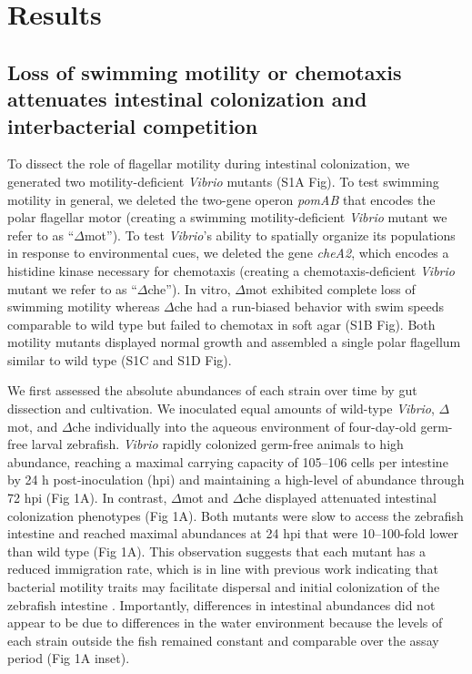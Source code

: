\section{Results}

\subsection{Loss of swimming motility or chemotaxis attenuates intestinal colonization and interbacterial competition}
To dissect the role of flagellar motility during intestinal colonization, we generated two motility-deficient \textit{Vibrio} mutants (S1A Fig). To test swimming motility in general, we deleted the two-gene operon \textit{pomAB} that encodes the polar flagellar motor (creating a swimming motility-deficient \textit{Vibrio} mutant we refer to as ``$\Delta$mot''). To test \textit{Vibrio}'s ability to spatially organize its populations in response to environmental cues, we deleted the gene \textit{cheA2}, which encodes a histidine kinase necessary for chemotaxis (creating a chemotaxis-deficient \textit{Vibrio} mutant we refer to as ``$\Delta$che''). In vitro, $\Delta$mot exhibited complete loss of swimming motility whereas $\Delta$che had a run-biased behavior with swim speeds comparable to wild type but failed to chemotax in soft agar (S1B Fig). Both motility mutants displayed normal growth and assembled a single polar flagellum similar to wild type (S1C and S1D Fig). 

We first assessed the absolute abundances of each strain over time by gut dissection and cultivation. We inoculated equal amounts of wild-type \textit{Vibrio}, $\Delta$mot, and $\Delta$che individually into the aqueous environment of four-day-old germ-free larval zebrafish. \textit{Vibrio} rapidly colonized germ-free animals to high abundance, reaching a maximal carrying capacity of 105–106 cells per intestine by 24 h post-inoculation (hpi) and maintaining a high-level of abundance through 72 hpi (Fig 1A). In contrast, $\Delta$mot and $\Delta$che displayed attenuated intestinal colonization phenotypes (Fig 1A). Both mutants were slow to access the zebrafish intestine and reached maximal abundances at 24 hpi that were 10–100-fold lower than wild type (Fig 1A). This observation suggests that each mutant has a reduced immigration rate, which is in line with previous work indicating that bacterial motility traits may facilitate dispersal and initial colonization of the zebrafish intestine \cite{robinson_experimental_2018,burns_interhost_2017}. Importantly, differences in intestinal abundances did not appear to be due to differences in the water environment because the levels of each strain outside the fish remained constant and comparable over the assay period (Fig 1A inset).

